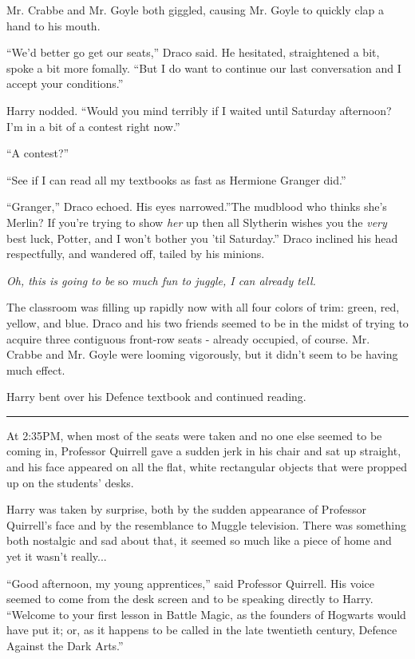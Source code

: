 Mr. Crabbe and Mr. Goyle both giggled, causing Mr. Goyle to quickly clap
a hand to his mouth.

``We'd better go get our seats,'' Draco said. He hesitated, straightened
a bit, spoke a bit more fomally. ``But I do want to continue our last
conversation and I accept your conditions.''

Harry nodded. ``Would you mind terribly if I waited until Saturday
afternoon? I'm in a bit of a contest right now.''

``A contest?''

``See if I can read all my textbooks as fast as Hermione Granger did.''

``Granger,'' Draco echoed. His eyes narrowed.''The mudblood who thinks
she's Merlin? If you're trying to show \emph{her} up then all Slytherin
wishes you the \emph{very} best luck, Potter, and I won't bother you
'til Saturday.'' Draco inclined his head respectfully, and wandered off,
tailed by his minions.

\emph{Oh, this is going to be} so \emph{much fun to juggle, I can
already tell.}

The classroom was filling up rapidly now with all four colors of trim:
green, red, yellow, and blue. Draco and his two friends seemed to be in
the midst of trying to acquire three contiguous front-row seats -
already occupied, of course. Mr. Crabbe and Mr. Goyle were looming
vigorously, but it didn't seem to be having much effect.

Harry bent over his Defence textbook and continued reading.

\begin{center}\rule{3in}{0.4pt}\end{center}

At 2:35PM, when most of the seats were taken and no one else seemed to
be coming in, Professor Quirrell gave a sudden jerk in his chair and sat
up straight, and his face appeared on all the flat, white rectangular
objects that were propped up on the students' desks.

Harry was taken by surprise, both by the sudden appearance of Professor
Quirrell's face and by the resemblance to Muggle television. There was
something both nostalgic and sad about that, it seemed so much like a
piece of home and yet it wasn't really...

``Good afternoon, my young apprentices,'' said Professor Quirrell. His
voice seemed to come from the desk screen and to be speaking directly to
Harry. ``Welcome to your first lesson in Battle Magic, as the founders
of Hogwarts would have put it; or, as it happens to be called in the
late twentieth century, Defence Against the Dark Arts.''

